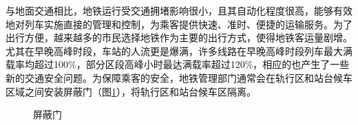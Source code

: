 与地面交通相比，地铁运行受交通拥堵影响很小，且其自动化程度很高，能够有效地对列车实施直接的管理和控制，为乘客提供快速、准时、便捷的运输服务。为了出行方便，越来越多的市民选择地铁作为主要的出行方式，使得地铁客运量剧增。尤其在早晚高峰时段，车站的人流更是爆满，许多线路在早晚高峰时段列车最大满载率均超过100\%，部分区段高峰小时最达满载率超过120\%，相应的也产生了一些新的交通安全问题。为保障乘客的安全，地铁管理部门通常会在轨行区和站台候车区域之间安装屏蔽门（图\ref{屏蔽门}），将轨行区和站台候车区隔离。
\begin{figure}[htbp]
	\centering
	\hspace{12mm}
	\hspace{12mm}
	\caption{屏蔽门}\label{屏蔽门}
\end{figure}

